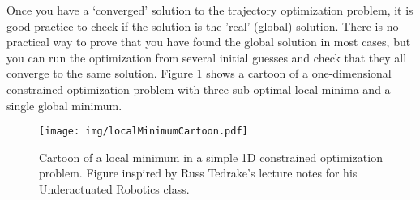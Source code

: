 \par Once you have a `converged' solution to the trajectory optimization problem, it is good practice to check if the solution is the 'real' (global) solution. There is no practical way to prove that you have found the global solution in most cases, but you can run the optimization from several initial guesses and check that they all converge to the same solution. Figure \ref{fig:localMinCartoon} shows a cartoon of a one-dimensional constrained optimization problem with three sub-optimal local minima and a single global minimum.
\begin{figure}
\centering
\texttt{[image: img/localMinimumCartoon.pdf]}
\caption{Cartoon of a local minimum in a simple 1D constrained optimization problem. Figure inspired by Russ Tedrake's lecture notes for his Underactuated Robotics class.}
\label{fig:localMinCartoon}
\end{figure}

